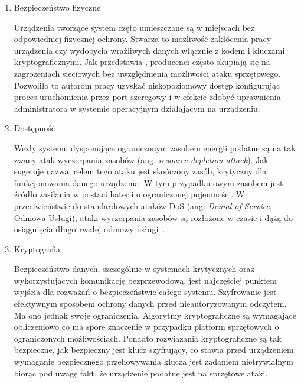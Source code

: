 		\begin{enumerate}[label=\Alph*.]
			\item Bezpieczeństwo fizyczne

				Urządzenia tworzące system częto umieszczane są w miejscach bez odpowiedniej fizycznej ochrony. Stwarza to możliwość zakłócenia pracy urządzenia czy wydobycia wrażliwych danych włącznie z kodem i kluczami kryptograficznymi. Jak przedstawia \cite{iot-hardware-attack}, producenci często skupiają się na zagrożeniach sieciowych bez uwzględnienia możliwości ataku sprzętowego. Pozwoliło to autorom pracy uzyskać niskopoziomowy dostęp konfigurując proces uruchomienia przez port szeregowy i w efekcie zdobyć uprawnienia administratora w systemie operacyjnym działającym na urządzeniu.

			\item Dostępność

				Wezły systemu dysponujące ograniczonym zasobem energii podatne są na tak zwany atak wyczerpania zasobów (ang. \textit{resource depletion attack}). Jak sugeruje nazwa, celem tego ataku jest skończony zasób, krytyczny dla funkcjonowania danego urządzenia. W tym przypadku owym zasobem jest źródło zasilania w postaci baterii o ograniczonej pojemności. W przeciwieństwie do standardowych ataków DoS (ang. \textit{Denial of Service}, Odmowa Usługi), ataki wyczerpania zasobów są rozłożone w czasie i dążą do osiągnięcia długotrwałej odmowy usługi~\cite{iot-rd-attack}.

			\item Kryptografia

				Bezpieczeństwo danych, szczególnie w systemach krytycznych oraz wykorzystujących komunikację bezprzewodową, jest najczęściej punktem wyjścia dla rozważań o bezpieczeństwie całego systemu. Szyfrowanie jest efektywnym sposobem ochrony danych przed nieautoryzowanym odczytem. Ma ono jednak swoje ograniczenia. Algorytmy kryptograficzne są wymagające obliczeniowo co ma spore znaczenie w przypadku platform sprzętowych o ograniczonych możliwościach. Ponadto rozwiązania kryptograficzne są tak bezpieczne, jak bezpieczny jest klucz szyfrujący, co stawia przed urządzeniem wymaganie bezpiecznego przehowywania klucza jest zadaniem nietrywialnym biorąc pod uwagę fakt, że urządzenie podatne jest na sprzętowe ataki.

		\end{enumerate}




